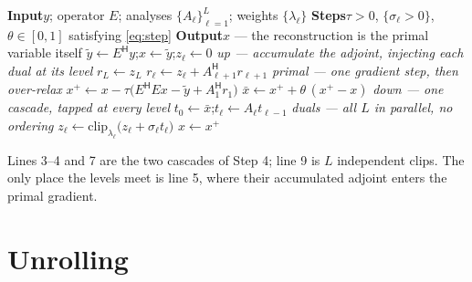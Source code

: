 \documentclass[11pt]{article}
\newcommand{\clip}{\mathrm{clip}}
\newcommand{\adj}{{\mathsf H}}
\begin{document}
\begin{algorithm}[H]
\caption{ML-LPDS, classical form (Condat--V\~u)}
\begin{algorithmic}[1]
\Statex \textbf{Input}\quad $y$; operator $E$; analyses $\{A_\ell\}_{\ell=1}^L$; weights $\{\lambda_\ell\}$
\Statex \textbf{Steps}\quad $\tau>0$, $\{\sigma_\ell>0\}$, $\theta\in[0,1]$ satisfying \eqref{eq:step}
\Statex \textbf{Output}\quad $x$ --- the reconstruction is the primal variable itself
\Statex\hrulefill
\State $\tilde y \gets E^\adj y$;\quad $x \gets \tilde y$;\quad $z_\ell \gets 0$ 
\Repeat
  \Statex \hspace{\algorithmicindent}\textit{up --- accumulate the adjoint, injecting each dual at its level}
  \State $r_L \gets z_L$
  \State $r_\ell \gets z_\ell + A_{\ell+1}^\adj r_{\ell+1}$ 
  \Statex \hspace{\algorithmicindent}\textit{primal --- one gradient step, then over-relax}
  \State $x^{+} \gets x - \tau\big(E^\adj E x - \tilde y + A_1^\adj r_1\big)$
  \State $\bar x \gets x^{+} + \theta\,(x^{+} - x)$
  \Statex \hspace{\algorithmicindent}\textit{down --- one cascade, tapped at every level}
  \State $t_0 \gets \bar x$;\quad $t_\ell \gets A_\ell t_{\ell-1}$ 
  \Statex \hspace{\algorithmicindent}\textit{duals --- all $L$ in parallel, no ordering}
  \State $z_\ell \gets \clip_{\lambda_\ell}\!\big(z_\ell + \sigma_\ell t_\ell\big)$ 
  \State $x \gets x^{+}$
\end{algorithmic}
\end{algorithm}

\noindent Lines 3--4 and 7 are the two cascades of Step 4; line 9 is $L$ independent clips. The only place
the levels meet is line 5, where their accumulated adjoint enters the primal gradient.

\section{Unrolling}
\end{document}
